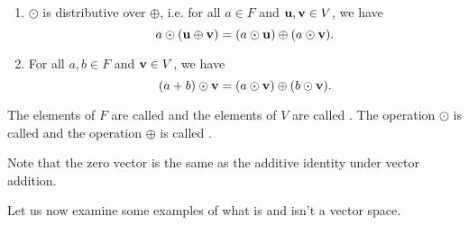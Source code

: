 \begin{defn}
\begin{enumerate}
    \item $ \odot $ is distributive over $ \oplus $, i.e. for all $ a\in F $ and $ \boldsymbol{\mathbf{u}},\boldsymbol{\mathbf{v}}\in V $, we have
    \begin{equation*}
        a\odot(\boldsymbol{\mathbf{u}}\oplus\boldsymbol{\mathbf{v}})=(a\odot\boldsymbol{\mathbf{u}})\oplus(a\odot\boldsymbol{\mathbf{v}}).
    \end{equation*}

    \item For all $ a,b\in F $ and $ \boldsymbol{\mathbf{v}}\in V $, we have
    \begin{equation*}
        (a+b)\odot\boldsymbol{\mathbf{v}}=(a\odot\boldsymbol{\mathbf{v}})\oplus(b\odot\boldsymbol{\mathbf{v}}).
    \end{equation*}
\end{enumerate}

The elements of $ F $ are called  and the elements of $ V $ are called . The operation $ \odot $ is called  and the operation $ \oplus $ is called .

Note that the zero vector is the same as the additive identity under vector addition.
\end{defn}

Let us now examine some examples of what is and isn't a vector space.


